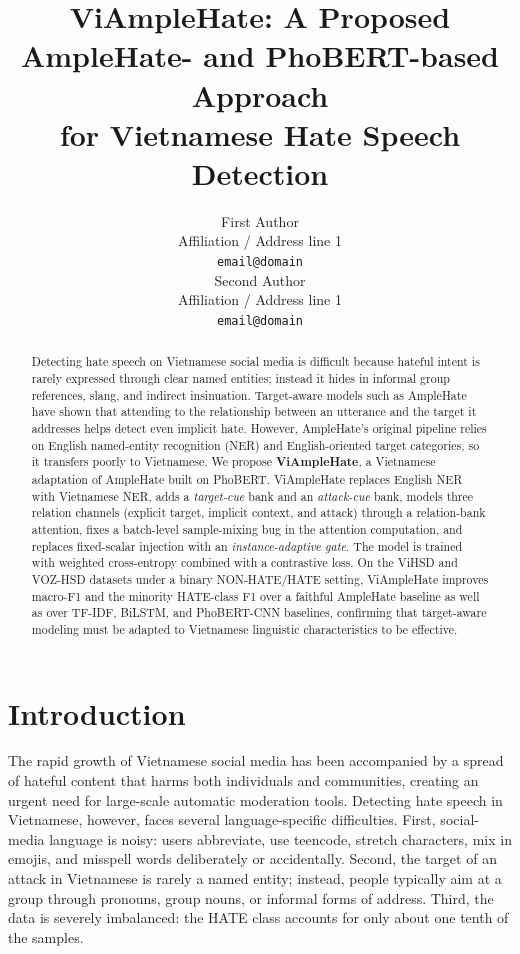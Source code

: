 \documentclass[11pt]{article}
\title{ViAmpleHate: A Proposed AmpleHate- and PhoBERT-based Approach\\ for Vietnamese Hate Speech Detection}
\author{First Author \\
  Affiliation / Address line 1 \\
  \texttt{email@domain} \\\And
  Second Author \\
  Affiliation / Address line 1 \\
  \texttt{email@domain} \\}
\begin{document}
\maketitle

\begin{abstract}
Detecting hate speech on Vietnamese social media is difficult because hateful intent is rarely expressed through clear named entities; instead it hides in informal group references, slang, and indirect insinuation. Target-aware models such as AmpleHate have shown that attending to the relationship between an utterance and the target it addresses helps detect even implicit hate. However, AmpleHate's original pipeline relies on English named-entity recognition (NER) and English-oriented target categories, so it transfers poorly to Vietnamese. We propose \textbf{ViAmpleHate}, a Vietnamese adaptation of AmpleHate built on PhoBERT. ViAmpleHate replaces English NER with Vietnamese NER, adds a \emph{target-cue} bank and an \emph{attack-cue} bank, models three relation channels (explicit target, implicit context, and attack) through a relation-bank attention, fixes a batch-level sample-mixing bug in the attention computation, and replaces fixed-scalar injection with an \emph{instance-adaptive gate}. The model is trained with weighted cross-entropy combined with a contrastive loss. On the ViHSD and VOZ-HSD datasets under a binary NON-HATE/HATE setting, ViAmpleHate improves macro-F1 and the minority HATE-class F1 over a faithful AmpleHate baseline as well as over TF-IDF, BiLSTM, and PhoBERT-CNN baselines, confirming that target-aware modeling must be adapted to Vietnamese linguistic characteristics to be effective.
\end{abstract}

\section{Introduction}

The rapid growth of Vietnamese social media has been accompanied by a spread of hateful content that harms both individuals and communities, creating an urgent need for large-scale automatic moderation tools. Detecting hate speech in Vietnamese, however, faces several language-specific difficulties. First, social-media language is noisy: users abbreviate, use teencode, stretch characters, mix in emojis, and misspell words deliberately or accidentally. Second, the target of an attack in Vietnamese is rarely a named entity; instead, people typically aim at a group through pronouns, group nouns, or informal forms of address. Third, the data is severely imbalanced: the HATE class accounts for only about one tenth of the samples.
\end{document}
